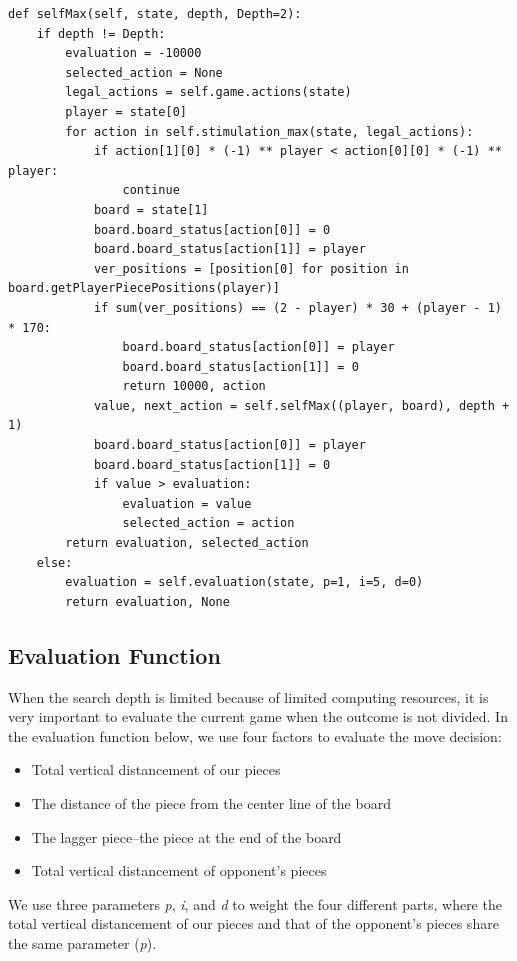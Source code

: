 \documentclass[aps,letterpaper,10pt]{article}
\begin{document}
\begin{lstlisting}[style=python]
def selfMax(self, state, depth, Depth=2):
	if depth != Depth:
		evaluation = -10000
		selected_action = None
		legal_actions = self.game.actions(state)
		player = state[0]
		for action in self.stimulation_max(state, legal_actions):
			if action[1][0] * (-1) ** player < action[0][0] * (-1) ** player:
				continue
			board = state[1]
			board.board_status[action[0]] = 0
			board.board_status[action[1]] = player
			ver_positions = [position[0] for position in board.getPlayerPiecePositions(player)]
			if sum(ver_positions) == (2 - player) * 30 + (player - 1) * 170:
				board.board_status[action[0]] = player
				board.board_status[action[1]] = 0
				return 10000, action
			value, next_action = self.selfMax((player, board), depth + 1)
			board.board_status[action[0]] = player
			board.board_status[action[1]] = 0
			if value > evaluation:
				evaluation = value
				selected_action = action
		return evaluation, selected_action
	else:
		evaluation = self.evaluation(state, p=1, i=5, d=0)
		return evaluation, None
\end{lstlisting}



\subsection{Evaluation Function}
When the search depth is limited because of limited computing resources, it is very important to evaluate the current game when the outcome is not divided.
In the evaluation function below, we use four factors to evaluate the move decision:
\begin{itemize}
\item Total vertical distancement of our pieces
\item The distance of the piece from the center line of the board
\item The lagger piece--the piece at the end of the board
\item Total vertical distancement of opponent's pieces
\end{itemize}

We use three parameters {\itshape p}, {\itshape i}, and {\itshape d} to weight the four different parts, where the total vertical distancement of our pieces and that of the opponent's pieces share the same parameter ({\itshape p}).
\end{document}
